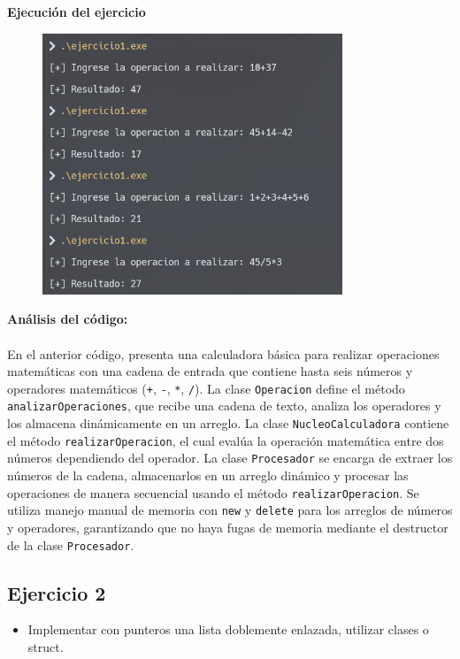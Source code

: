 \documentclass{article}
\begin{document}
        \textbf{Ejecución del ejercicio}
        \begin{figure}[H]
        	\centering
         	\includegraphics[width=0.8\textwidth,keepaspectratio]{img/ejercicio1.png}
        \end{figure}

        \textbf{Análisis del código:} \\\\
        En el anterior código, presenta una calculadora básica para realizar operaciones matemáticas con una cadena de entrada que contiene hasta seis números y operadores matemáticos (\verb|+|, \verb|-|, \verb|*|, \verb|/|). La clase \texttt{Operacion} define el método \texttt{analizarOperaciones}, que recibe una cadena de texto, analiza los operadores y los almacena dinámicamente en un arreglo. La clase \texttt{NucleoCalculadora} contiene el método \texttt{realizarOperacion}, el cual evalúa la operación matemática entre dos números dependiendo del operador. La clase \texttt{Procesador} se encarga de extraer los números de la cadena, almacenarlos en un arreglo dinámico y procesar las operaciones de manera secuencial usando el método \texttt{realizarOperacion}. Se utiliza manejo manual de memoria con \texttt{new} y \texttt{delete} para los arreglos de números y operadores, garantizando que no haya fugas de memoria mediante el destructor de la clase \texttt{Procesador}.


    \subsection{Ejercicio 2}
        \begin{itemize}
            \item Implementar con punteros una lista doblemente enlazada, utilizar clases o struct. 
        \end{itemize}  
        
\end{document}
